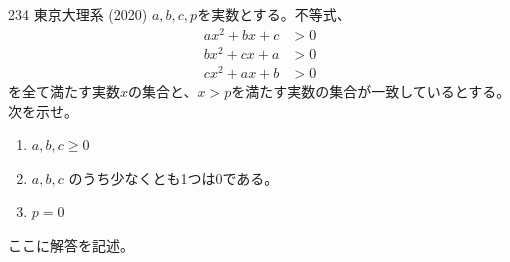 \begin{prob}{234}{ \maru}{東京大理系 (2020)}
 $a, b, c, p$を実数とする。不等式、
 \begin{align*}
  ax^2+bx+c&>0 \\
  bx^2+cx+a&>0 \\
  cx^2+ax+b&>0
 \end{align*}
 を全て満たす実数$x$の集合と、$x>p$を満たす実数の集合が一致しているとする。次を示せ。
 \begin{enumerate}
  \item $a, b, c \ge 0$
  \item $a, b, c$ のうち少なくとも1つは0である。
  \item $p=0$
 \end{enumerate}
\end{prob}
ここに解答を記述。